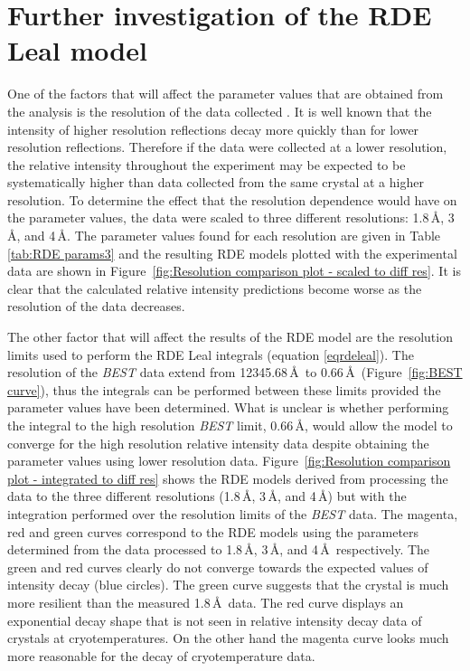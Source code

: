 \section{Further investigation of the RDE Leal model}
\label{sec:Further investigation of the RDE Leal model}

One of the factors that will affect the parameter values that are obtained from the analysis is the resolution of the data collected \cite{leal2012}.
It is well known that the intensity of higher resolution reflections decay more quickly than for lower resolution reflections.
Therefore if the data were collected at a lower resolution, the relative intensity throughout the experiment may be expected to be systematically higher than data collected from the same crystal at a higher resolution.
To determine the effect that the resolution dependence would have on the parameter values, the data were scaled to three different resolutions: 1.8\,\AA, 3\,\AA, and 4\,\AA.
The parameter values found for each resolution are given in Table \ref{tab:RDE params3} and the resulting RDE models plotted with the experimental data are shown in Figure~\ref{fig:Resolution comparison plot - scaled to diff res}.
It is clear that the calculated relative intensity predictions become worse as the resolution of the data decreases.

The other factor that will affect the results of the RDE model are the resolution limits used to perform the RDE Leal integrals (equation \ref{eqrdeleal}).
The resolution of the \textit{BEST} data extend from 12345.68\,\AA\ to 0.66\,\AA\ (Figure~\ref{fig:BEST curve}), thus the integrals can be performed between these limits provided the parameter values have been determined.
What is unclear is whether performing the integral to the high resolution \textit{BEST} limit, 0.66\,\AA, would allow the model to converge for the high resolution relative intensity data despite obtaining the parameter values using lower resolution data.
Figure~\ref{fig:Resolution comparison plot - integrated to diff res} shows the RDE models derived from processing the data to the three different resolutions (1.8\,\AA, 3\,\AA, and 4\,\AA) but with the integration performed over the resolution limits of the \textit{BEST} data.
The magenta, red and green curves correspond to the RDE models using the parameters determined from the data processed to 1.8\,\AA, 3\,\AA, and 4\,\AA\ respectively.
The green and red curves clearly do not converge towards the expected values of intensity decay (blue circles).
The green curve suggests that the crystal is much more resilient than the measured 1.8$\,$\AA\ data.
The red curve displays an exponential decay shape that is not seen in relative intensity decay data of crystals at cryotemperatures.
On the other hand the magenta curve looks much more reasonable for the decay of cryotemperature data.

